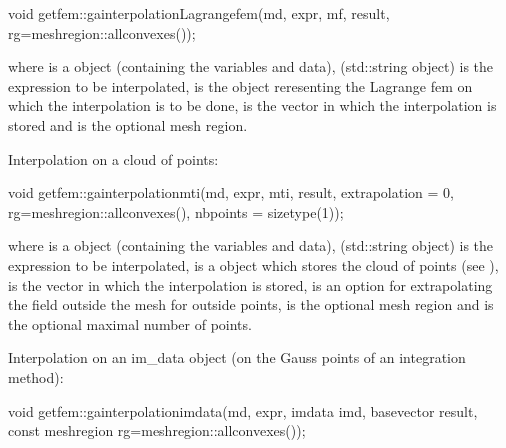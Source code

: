 \documentclass[a4paper,11pt,english]{sphinxmanual}
\begin{document}
\begin{sphinxVerbatim}[commandchars=\\\{\}]
void getfem::ga\PYGZus{}interpolation\PYGZus{}Lagrange\PYGZus{}fem(md, expr, mf, result, rg=mesh\PYGZus{}region::all\PYGZus{}convexes());
\end{sphinxVerbatim}

where  is a  object (containing the variables and data),  (std::string object) is the expression to be interpolated,  is the  object reresenting the Lagrange fem on which the interpolation is to be done,  is the vector in which the interpolation is stored and  is the optional mesh region.

Interpolation on a cloud of points:

\begin{sphinxVerbatim}[commandchars=\\\{\}]
void getfem::ga\PYGZus{}interpolation\PYGZus{}mti(md, expr, mti, result, extrapolation = 0, rg=mesh\PYGZus{}region::all\PYGZus{}convexes(), nbpoints = size\PYGZus{}type(\PYGZhy{}1));
\end{sphinxVerbatim}

where  is a  object (containing the variables and data),  (std::string object) is the expression to be interpolated,  is a  object which stores the cloud of points (see ),  is the vector in which the interpolation is stored,  is an option for extrapolating the field outside the mesh for outside points,  is the optional mesh region and  is the optional maximal number of points.

Interpolation on an im\_data object (on the Gauss points of an integration method):

\begin{sphinxVerbatim}[commandchars=\\\{\}]
void getfem::ga\PYGZus{}interpolation\PYGZus{}im\PYGZus{}data(md, expr, im\PYGZus{}data \PYGZam{}imd,
 base\PYGZus{}vector \PYGZam{}result, const mesh\PYGZus{}region \PYGZam{}rg=mesh\PYGZus{}region::all\PYGZus{}convexes());
\end{sphinxVerbatim}
\end{document}
